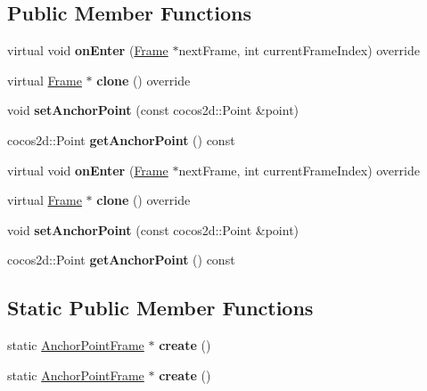 \subsection*{Public Member Functions}
\begin{DoxyCompactItemize}
\item 
\mbox{\label{classAnchorPointFrame_adcc35d40448dbf55a6997418ce03f7ee}} 
virtual void {\bfseries on\+Enter} (\hyperlink{classFrame}{Frame} $\ast$next\+Frame, int current\+Frame\+Index) override
\item 
\mbox{\label{classAnchorPointFrame_a121629feb6c10d327008a2929a5dbf44}} 
virtual \hyperlink{classFrame}{Frame} $\ast$ {\bfseries clone} () override
\item 
\mbox{\label{classAnchorPointFrame_a6bf737db68ee9e3ba5594a12c66cfc09}} 
void {\bfseries set\+Anchor\+Point} (const cocos2d\+::\+Point \&point)
\item 
\mbox{\label{classAnchorPointFrame_af972062c1ff296e6028a104d0bf0c093}} 
cocos2d\+::\+Point {\bfseries get\+Anchor\+Point} () const
\item 
\mbox{\label{classAnchorPointFrame_a80f59dce68b812451eaad43c7834f83e}} 
virtual void {\bfseries on\+Enter} (\hyperlink{classFrame}{Frame} $\ast$next\+Frame, int current\+Frame\+Index) override
\item 
\mbox{\label{classAnchorPointFrame_a7404772446d44246c65d2e82b7d57210}} 
virtual \hyperlink{classFrame}{Frame} $\ast$ {\bfseries clone} () override
\item 
\mbox{\label{classAnchorPointFrame_a6bf737db68ee9e3ba5594a12c66cfc09}} 
void {\bfseries set\+Anchor\+Point} (const cocos2d\+::\+Point \&point)
\item 
\mbox{\label{classAnchorPointFrame_af972062c1ff296e6028a104d0bf0c093}} 
cocos2d\+::\+Point {\bfseries get\+Anchor\+Point} () const
\end{DoxyCompactItemize}
\subsection*{Static Public Member Functions}
\begin{DoxyCompactItemize}
\item 
\mbox{\label{classAnchorPointFrame_ad97fe083a21dd5538a9c70c5f6f10ed2}} 
static \hyperlink{classAnchorPointFrame}{Anchor\+Point\+Frame} $\ast$ {\bfseries create} ()
\item 
\mbox{\label{classAnchorPointFrame_ad753d5d33d0f84aaf163ecbdc26f52b7}} 
static \hyperlink{classAnchorPointFrame}{Anchor\+Point\+Frame} $\ast$ {\bfseries create} ()
\end{DoxyCompactItemize}
